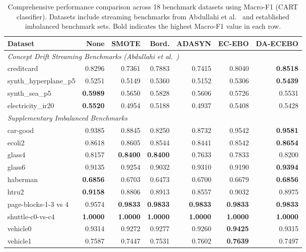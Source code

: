 \documentclass[preprint,10pt]{elsarticle}
\begin{document}
\begin{table}[!htbp]
\centering\footnotesize\setlength{\tabcolsep}{4pt}
\caption{Comprehensive performance comparison across 18 benchmark datasets using Macro-F1 (CART classifier). Datasets include streaming benchmarks from Abdullahi et al.~\cite{abdullahi2025} and established imbalanced benchmark sets. Bold indicates the highest Macro-F1 value in each row.}\label{tab:static}
\begin{tabular}{lrrrrrr}
\toprule
Dataset & None & SMOTE & Bord. & ADASYN & EC-EBO & \textbf{DA-ECEBO}\\
\midrule
\multicolumn{7}{l}{\emph{Concept Drift Streaming Benchmarks (Abdullahi et al.~\cite{abdullahi2025})}}\\
creditcard & 0.8296 & 0.7361 & 0.7883 & 0.7415 & 0.8040 & \textbf{0.8518}\\
synth\_hyperplane\_p5 & 0.5251 & 0.5149 & 0.5360 & 0.5152 & 0.5306 & \textbf{0.5439}\\
synth\_sea\_p5 & \textbf{0.5989} & 0.5650 & 0.5828 & 0.5606 & 0.5726 & 0.5531\\
electricity\_ir20 & \textbf{0.5520} & 0.4954 & 0.5188 & 0.4937 & 0.5408 & 0.5428\\
\midrule
\multicolumn{7}{l}{\emph{Supplementary Imbalanced Benchmarks}}\\
car-good & 0.9385 & 0.8845 & 0.8250 & 0.8732 & 0.9542 & \textbf{0.9581}\\
ecoli2 & 0.8618 & 0.8605 & 0.8544 & 0.8441 & 0.8542 & \textbf{0.8654}\\
glass4 & 0.8157 & \textbf{0.8400} & \textbf{0.8400} & 0.7633 & 0.7833 & 0.8200\\
glass6 & 0.9135 & 0.9254 & 0.9032 & 0.9310 & 0.9190 & \textbf{0.9394}\\
haberman & \textbf{0.6856} & 0.6703 & 0.6473 & 0.6700 & 0.6679 & \textbf{0.6856}\\
htru2 & \textbf{0.9158} & 0.8806 & 0.8913 & 0.8557 & 0.9032 & 0.8975\\
page-blocks-1-3 vs 4 & 0.9574 & \textbf{0.9833} & \textbf{0.9833} & \textbf{0.9833} & \textbf{0.9833} & \textbf{0.9833}\\
shuttle-c0-vs-c4 & \textbf{1.0000} & \textbf{1.0000} & \textbf{1.0000} & \textbf{1.0000} & \textbf{1.0000} & \textbf{1.0000}\\
vehicle0 & 0.9314 & 0.9272 & 0.9277 & 0.9260 & \textbf{0.9425} & 0.9315\\
vehicle1 & 0.7587 & 0.7447 & 0.7531 & 0.7602 & \textbf{0.7639} & 0.7497\\

\end{tabular}
\end{table}
\end{document}
